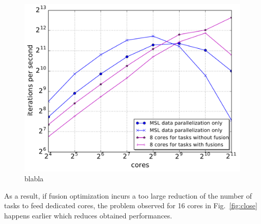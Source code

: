 \begin{figure}[!h]\begin{center}
  \includegraphics[width=.6\textwidth]{../results/task_scaling/500_200/withwithout8_close_median.pdf}
  \caption{blabla}
  \label{fig:fusion2}
\end{center}\end{figure}

As a result, if fusion optimization incurs a too large reduction of the number of tasks to feed dedicated cores, the problem observed for 16 cores in Fig.~\ref{fig:close} happens earlier which reduces obtained performances.